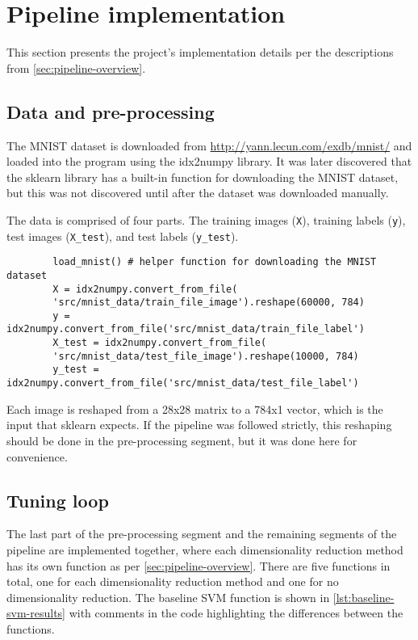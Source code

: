 \section{Pipeline implementation}\label{sec:pipeline-implementation}
This section presents the project's implementation details per the descriptions from \autoref{sec:pipeline-overview}.

\subsection{Data and pre-processing}\label{subsec:data-and-pre-processing}
The MNIST dataset is downloaded from \url{http://yann.lecun.com/exdb/mnist/} and loaded into the program using the idx2numpy library. It was later discovered that the \gls{sklearn} library has a built-in function for downloading the MNIST dataset, but this was not discovered until after the dataset was downloaded manually.

The data is comprised of four parts. The training images (\texttt{X}), training labels (\texttt{y}), test images (\texttt{X\_test}), and test labels (\texttt{y\_test}).


\begin{listing}[htb!]
    \centering
    \begin{verbatim}
        load_mnist() # helper function for downloading the MNIST dataset
        X = idx2numpy.convert_from_file(
        'src/mnist_data/train_file_image').reshape(60000, 784)
        y = idx2numpy.convert_from_file('src/mnist_data/train_file_label')
        X_test = idx2numpy.convert_from_file(
        'src/mnist_data/test_file_image').reshape(10000, 784)
        y_test = idx2numpy.convert_from_file('src/mnist_data/test_file_label')
    \end{verbatim}
    \caption{}
    \label{lst:}
\end{listing}

Each image is reshaped from a 28x28 matrix to a 784x1 vector, which is the input that \gls{sklearn} expects. If the pipeline was followed strictly, this reshaping should be done in the pre-processing segment, but it was done here for convenience.

\subsection{Tuning loop}\label{subsec:tuning-loop}
The last part of the pre-processing segment and the remaining segments of the pipeline are implemented together, where each dimensionality reduction method has its own function as per \autoref{sec:pipeline-overview}. There are five functions in total, one for each dimensionality reduction method and one for no dimensionality reduction. The baseline SVM function is shown in \autoref{lst:baseline-svm-results} with comments in the code highlighting the differences between the functions.


